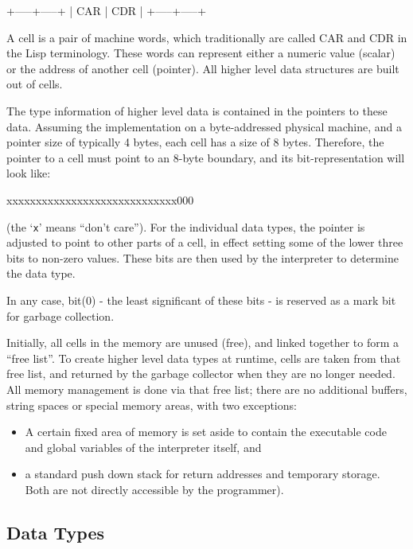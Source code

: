 \begin{wideverbatim}
+-----+-----+
| CAR | CDR |
+-----+-----+
\end{wideverbatim}

A cell is a pair of machine words, which traditionally are called CAR
and CDR in the Lisp terminology. These words can represent either a
numeric value (scalar) or the address of another cell (pointer). All
higher level data structures are built out of cells.

The type information of higher level data is contained in the pointers
to these data. Assuming the implementation on a byte-addressed physical
machine, and a pointer size of typically 4 bytes, each cell has a size
of 8 bytes. Therefore, the pointer to a cell must point to an 8-byte
boundary, and its bit-representation will look like:


\begin{wideverbatim}
xxxxxxxxxxxxxxxxxxxxxxxxxxxxx000
\end{wideverbatim}

(the `\texttt{x}' means ``don't care''). For the individual data types, the
pointer is adjusted to point to other parts of a cell, in effect setting
some of the lower three bits to non-zero values. These bits are then
used by the interpreter to determine the data type.

In any case, bit(0) - the least significant of these bits - is reserved
as a mark bit for garbage collection.

Initially, all cells in the memory are unused (free), and linked
together to form a ``free list''. To create higher level data types at
runtime, cells are taken from that free list, and returned by the
garbage collector when they are no longer needed. All memory management
is done via that free list; there are no additional buffers, string
spaces or special memory areas, with two exceptions:

\begin{itemize}
\item A certain fixed area of memory is set aside to contain the executable
   code and global variables of the interpreter itself, and
\item a standard push down stack for return addresses and temporary
   storage. Both are not directly accessible by the programmer).
\end{itemize}


 
\subsection{Data Types}
\label{sec:refm-data-types}


